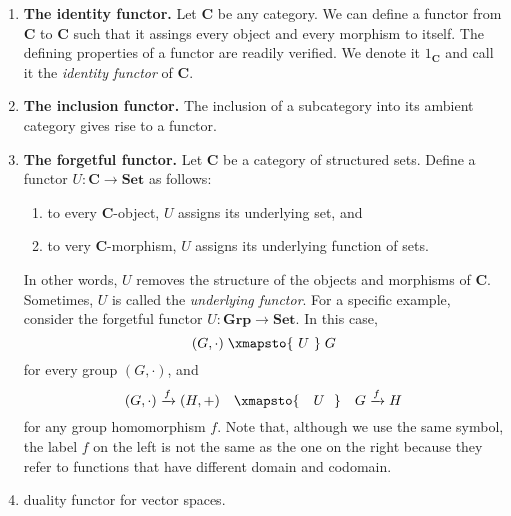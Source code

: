 \begin{example}
\begin{enumerate}[label=(\alph*)]
    \item \textbf{The identity functor.} 
    Let \(\mathbf{C}\) be any category.
    We can define a functor from \(\mathbf{C}\) to \(\mathbf{C}\)  such that it assings every object and every morphism  to itself.
    The defining properties of a functor are readily verified.
    We denote it   \(1_{\mathbf{C}}  \) and call it  the \textit{identity functor} of \(\mathbf{C}\).
    \item \textbf{The inclusion functor.} The inclusion of a subcategory into its ambient category gives rise to a functor.
    \item \textbf{The forgetful functor.} Let \(\mathbf{C}\) be a category of structured sets. Define a functor \(U\colon \mathbf{C}\to \mathbf{Set}\) as follows:
    \begin{enumerate}[label=(\roman*)]
        \item to every \(\mathbf{C}\)-object, \(U\) assigns its underlying set, and
        \item to very \(\mathbf{C}\)-morphism, \(U\) assigns its underlying function of sets.
    \end{enumerate} 
    In other words, \(U\) removes the structure of the objects and morphisms of \(\mathbf{C}\).
    Sometimes, \(U\) is called the \textit{underlying functor}.
    For a specific example, consider the forgetful functor \(U\colon \mathbf{Grp}\to \mathbf{Set}\).
    In this case,  
    \[(G,\cdot ) \;\xmapsto{\text{   } U \text{  }}\; G\]
    for every group \((G, \cdot)\), and  
    \[ (G,\cdot )\xrightarrow{f}(H, +)\quad\xmapsto{\text{ { } } U \text{ { }}}\quad G\xrightarrow{f} H\]
    for any group homomorphism \(f\). %
    Note that, although we use the same symbol, the label \(f\) on the left is not the same as the one on the right because they refer to functions that have different domain and codomain.

    \item duality functor for vector spaces.

\end{enumerate}
\end{example}


